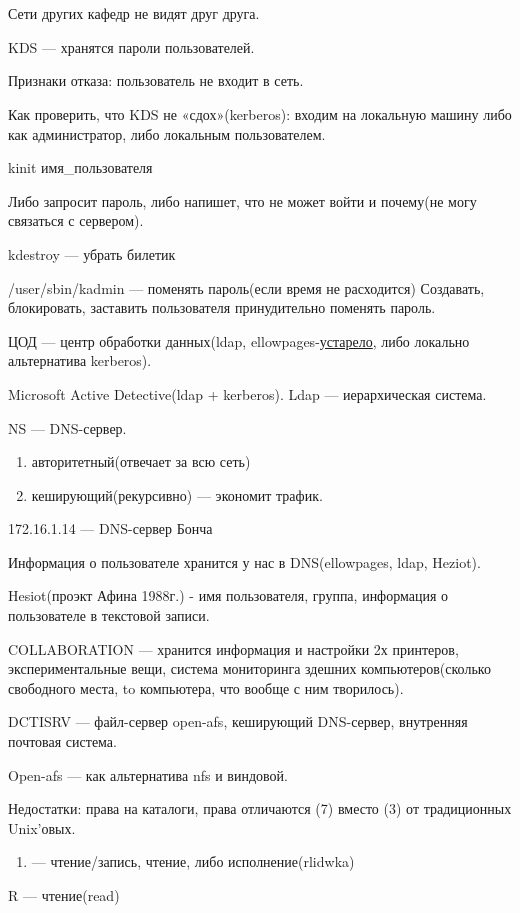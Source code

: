 \par 
\\

\par 
\\

\par 
Сети других кафедр не видят друг друга.
\par 
KDS — хранятся пароли пользователей.
\par 
Признаки отказа: пользователь не входит
в сеть.
\par 
Как проверить, что KDS не «сдох»(kerberos):
входим на локальную машину либо как
администратор, либо локальным
пользователем.
\par 
kinit имя\_пользователя
\par 
Либо запросит пароль, либо напишет, что
не может войти и почему(не могу связаться
с сервером).
\par 
kdestroy — убрать билетик
\par 
/user/sbin/kadmin — поменять пароль(если время
не расходится) Создавать, блокировать,
заставить пользователя принудительно
поменять пароль.
\par ЦОД
— центр обработки данных(ldap,
ellowpages-\underline{устарело},
либо локально альтернатива kerberos).
\par 
Microsoft Active Detective(ldap + kerberos). Ldap — иерархическая
система.
\par 
NS — DNS-сервер.
\begin{enumerate}
	\item \par 
	авторитетный(отвечает за всю сеть)
	\item \par 
	кеширующий(рекурсивно) — экономит
	трафик.
\end{enumerate}
\par 
172.16.1.14 — DNS-сервер Бонча
\par 
Информация о пользователе хранится у
нас в DNS(ellowpages, ldap, Heziot).
\par 
Hesiot(проэкт Афина 1988г.) - имя пользователя,
группа, информация о пользователе в
текстовой записи.
\par COLLABORATION
— хранится информация и настройки 2х
принтеров, экспериментальные вещи,
система мониторинга здешних
компьютеров(сколько свободного места,
to
компьютера, что вообще с ним творилось).
\par 
DCTISRV — файл-сервер open-afs, кеширующий
DNS-сервер, внутренняя почтовая система.
\par 
Open-afs — как альтернатива nfs и
виндовой.
\par 
Недостатки: права на каталоги,
права отличаются (7) вместо (3) от
традиционных Unix'овых.
\begin{enumerate}
	\item \par —
	чтение/запись,
	чтение, либо исполнение(rlidwka)
\end{enumerate}
\par 
R — чтение(read) 

